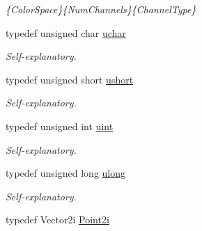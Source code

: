 \begin{DoxyCompactItemize}
\begin{DoxyCompactList}\small\item\em \{Color\-Space\}\{Num\-Channels\}\{Channel\-Type\} \end{DoxyCompactList}\item 
\hypertarget{group___eigen_typedefs_ga65f85814a8290f9797005d3b28e7e5fc}{typedef unsigned char \hyperlink{group___eigen_typedefs_ga65f85814a8290f9797005d3b28e7e5fc}{uchar}}\label{group___eigen_typedefs_ga65f85814a8290f9797005d3b28e7e5fc}

\begin{DoxyCompactList}\small\item\em Self-\/explanatory. \end{DoxyCompactList}\item 
\hypertarget{group___eigen_typedefs_gab95f123a6c9bcfee6a343170ef8c5f69}{typedef unsigned short \hyperlink{group___eigen_typedefs_gab95f123a6c9bcfee6a343170ef8c5f69}{ushort}}\label{group___eigen_typedefs_gab95f123a6c9bcfee6a343170ef8c5f69}

\begin{DoxyCompactList}\small\item\em Self-\/explanatory. \end{DoxyCompactList}\item 
\hypertarget{group___eigen_typedefs_ga91ad9478d81a7aaf2593e8d9c3d06a14}{typedef unsigned int \hyperlink{group___eigen_typedefs_ga91ad9478d81a7aaf2593e8d9c3d06a14}{uint}}\label{group___eigen_typedefs_ga91ad9478d81a7aaf2593e8d9c3d06a14}

\begin{DoxyCompactList}\small\item\em Self-\/explanatory. \end{DoxyCompactList}\item 
\hypertarget{group___eigen_typedefs_ga718b4eb2652c286f4d42dc18a8e71a1a}{typedef unsigned long \hyperlink{group___eigen_typedefs_ga718b4eb2652c286f4d42dc18a8e71a1a}{ulong}}\label{group___eigen_typedefs_ga718b4eb2652c286f4d42dc18a8e71a1a}

\begin{DoxyCompactList}\small\item\em Self-\/explanatory. \end{DoxyCompactList}\item 
\hypertarget{group___eigen_typedefs_ga048a27763e58f682b1b91af86144f701}{typedef Vector2i \hyperlink{group___eigen_typedefs_ga048a27763e58f682b1b91af86144f701}{Point2i}}\label{group___eigen_typedefs_ga048a27763e58f682b1b91af86144f701}


\end{DoxyCompactItemize}
